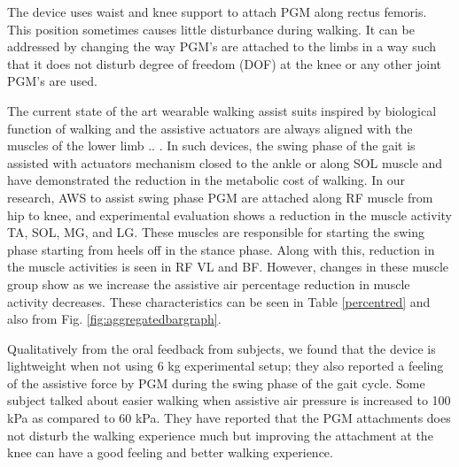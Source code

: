 \documentclass[letterpaper, 10 pt, conference]{ieeeconf}  %
\begin{document}
The device uses waist and knee support to attach PGM along rectus femoris. This position sometimes causes little disturbance during walking. It can be addressed by changing the way PGM’s are attached to the limbs in a way such that it does not disturb degree of freedom (DOF) at the knee or any other joint PGM’s are used. 

The current state of the art wearable walking assist suits inspired by biological function of walking and the assistive actuators are always aligned with the muscles of the lower limb \cite{8} .. \cite{13}. In such devices, the swing phase of the gait is assisted with actuators mechanism closed to the ankle or along SOL muscle and have demonstrated the reduction in the metabolic cost of walking. In our research, AWS to assist swing phase PGM are attached along RF muscle from hip to knee, and experimental evaluation shows a reduction in the muscle activity TA, SOL, MG, and LG. These muscles are responsible for starting the swing phase starting from heels off in the stance phase. Along with this, reduction in the muscle activities is seen in RF VL and BF. However, changes in these muscle group show as we increase the assistive air percentage reduction in muscle activity decreases. These characteristics can be seen in Table \ref{percentred} and also from Fig. \ref{fig:aggregatedbargraph}.

Qualitatively from the oral feedback from subjects, we found that the device is lightweight when not using 6 kg experimental setup; they also reported a feeling of the assistive force by PGM during the swing phase of the gait cycle. Some subject talked about easier walking when assistive air pressure is increased to 100 kPa as compared to 60 kPa. They have reported that the PGM attachments does not disturb the walking experience much but improving the attachment at the knee can have a good feeling and better walking experience. 
\end{document}
